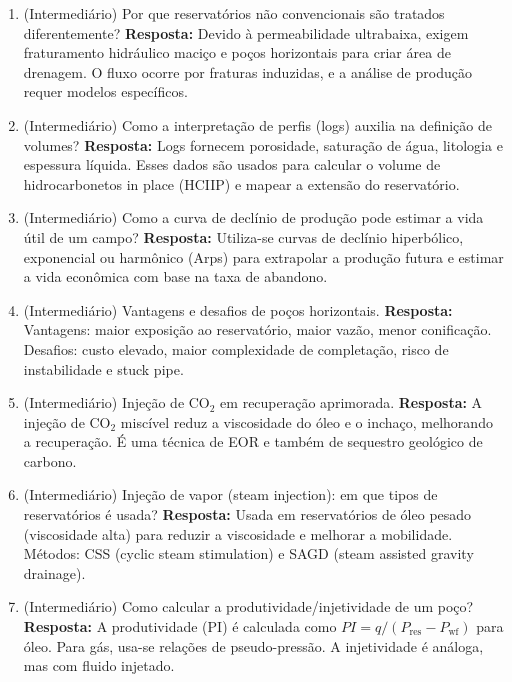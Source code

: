 \documentclass[11pt,a4paper]{article}
\begin{document}
\begin{enumerate}
  \item (Intermediário) Por que reservatórios não convencionais são tratados diferentemente?
  \textbf{Resposta:} Devido à permeabilidade ultrabaixa, exigem fraturamento hidráulico maciço e poços horizontais para criar área de drenagem. O fluxo ocorre por fraturas induzidas, e a análise de produção requer modelos específicos.

  \item (Intermediário) Como a interpretação de perfis (logs) auxilia na definição de volumes?
  \textbf{Resposta:} Logs fornecem porosidade, saturação de água, litologia e espessura líquida. Esses dados são usados para calcular o volume de hidrocarbonetos in place (HCIIP) e mapear a extensão do reservatório.

  \item (Intermediário) Como a curva de declínio de produção pode estimar a vida útil de um campo?
  \textbf{Resposta:} Utiliza-se curvas de declínio hiperbólico, exponencial ou harmônico (Arps) para extrapolar a produção futura e estimar a vida econômica com base na taxa de abandono.

  \item (Intermediário) Vantagens e desafios de poços horizontais.
  \textbf{Resposta:} Vantagens: maior exposição ao reservatório, maior vazão, menor conificação. Desafios: custo elevado, maior complexidade de completação, risco de instabilidade e stuck pipe.

  \item (Intermediário) Injeção de CO$_2$ em recuperação aprimorada.
  \textbf{Resposta:} A injeção de CO$_2$ miscível reduz a viscosidade do óleo e o inchaço, melhorando a recuperação. É uma técnica de EOR e também de sequestro geológico de carbono.

  \item (Intermediário) Injeção de vapor (steam injection): em que tipos de reservatórios é usada?
  \textbf{Resposta:} Usada em reservatórios de óleo pesado (viscosidade alta) para reduzir a viscosidade e melhorar a mobilidade. Métodos: CSS (cyclic steam stimulation) e SAGD (steam assisted gravity drainage).

  \item (Intermediário) Como calcular a produtividade/injetividade de um poço?
  \textbf{Resposta:} A produtividade (PI) é calculada como $PI = q / (P_{\text{res}} - P_{\text{wf}})$ para óleo. Para gás, usa-se relações de pseudo-pressão. A injetividade é análoga, mas com fluido injetado.


\end{enumerate}
\end{document}
